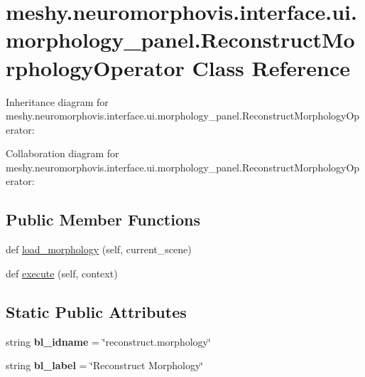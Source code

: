 \hypertarget{classmeshy_1_1neuromorphovis_1_1interface_1_1ui_1_1morphology__panel_1_1ReconstructMorphologyOperator}{}\section{meshy.\+neuromorphovis.\+interface.\+ui.\+morphology\+\_\+panel.\+Reconstruct\+Morphology\+Operator Class Reference}
\label{classmeshy_1_1neuromorphovis_1_1interface_1_1ui_1_1morphology__panel_1_1ReconstructMorphologyOperator}


Inheritance diagram for meshy.\+neuromorphovis.\+interface.\+ui.\+morphology\+\_\+panel.\+Reconstruct\+Morphology\+Operator\+:


Collaboration diagram for meshy.\+neuromorphovis.\+interface.\+ui.\+morphology\+\_\+panel.\+Reconstruct\+Morphology\+Operator\+:
\subsection*{Public Member Functions}
\begin{DoxyCompactItemize}
\item 
def \hyperlink{classmeshy_1_1neuromorphovis_1_1interface_1_1ui_1_1morphology__panel_1_1ReconstructMorphologyOperator_ad61d3d89a4be193a8cba79c183d60a6e}{load\+\_\+morphology} (self, current\+\_\+scene)
\item 
def \hyperlink{classmeshy_1_1neuromorphovis_1_1interface_1_1ui_1_1morphology__panel_1_1ReconstructMorphologyOperator_a67e0aba83f22b2f0911c27bc1b9b216a}{execute} (self, context)
\end{DoxyCompactItemize}
\subsection*{Static Public Attributes}
\begin{DoxyCompactItemize}
\item 
string {\bfseries bl\+\_\+idname} = \char`\"{}reconstruct.\+morphology\char`\"{}\hypertarget{classmeshy_1_1neuromorphovis_1_1interface_1_1ui_1_1morphology__panel_1_1ReconstructMorphologyOperator_a3eb9c386d7e002ea3ee13b0b1ce79fec}{}\label{classmeshy_1_1neuromorphovis_1_1interface_1_1ui_1_1morphology__panel_1_1ReconstructMorphologyOperator_a3eb9c386d7e002ea3ee13b0b1ce79fec}

\item 
string {\bfseries bl\+\_\+label} = \char`\"{}Reconstruct Morphology\char`\"{}\hypertarget{classmeshy_1_1neuromorphovis_1_1interface_1_1ui_1_1morphology__panel_1_1ReconstructMorphologyOperator_ad11b8fe7de9c22fdeb5dc009545e9fea}{}\label{classmeshy_1_1neuromorphovis_1_1interface_1_1ui_1_1morphology__panel_1_1ReconstructMorphologyOperator_ad11b8fe7de9c22fdeb5dc009545e9fea}

\end{DoxyCompactItemize}


